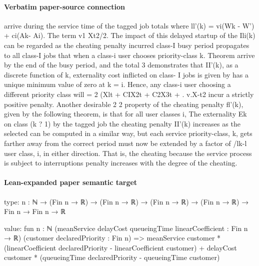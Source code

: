 \documentclass[10pt]{article}
\begin{document}
\paragraph{Verbatim paper-source connection}
\begin{ReviewVerbatim}
arrive during the service time of the tagged job totals                 where ll'(k) = vi(Wk - W') + ci(Ak- Ai). The term
v1 Xt2/2. The impact of this delayed startup of the                     Ili(k) can be regarded as the cheating penalty incurred
class-I busy period propagates to all class-I jobs that                 when a class-i user chooses priority-class k. Theorem
arrive by the end of the busy period, and the total                     3 demonstrates that II'(k), as a discrete function of k,
externality cost inflicted on class- I jobs is given by                 has a unique minimum value of zero at k = i. Hence,
                                                                        any class-i user choosing a different priority class will
    = 2 (Xlt + CIX2t + C2X3t + . v.X-t2                                 incur a strictly positive penalty. Another desirable
              2         2                                               property of the cheating penalty fl'(k), given by the
                                                                        following theorem, is that for all user classes i,
The externality Ek on class (k ? 1) by the tagged job
                                                                        the cheating penalty II'(k) increases as the selected
can be computed in a similar way, but each service
                                                                        priority-class, k, gets farther away from the correct
period must now be extended by a factor of /lk-l
                                               user class, i, in either direction. That is, the cheating
because the service process is subject to interruptions
                                                                        penalty increases with the degree of the cheating.
\end{ReviewVerbatim}



\paragraph{Lean-expanded paper semantic target}
\begin{ReviewVerbatim}
type:
{n : ℕ} → (Fin n → ℝ) → (Fin n → ℝ) → (Fin n → ℝ) → (Fin n → ℝ) → Fin n → Fin n → ℝ

value:
fun {n : ℕ} (meanService delayCost queueingTime linearCoefficient : Fin n → ℝ) (customer declaredPriority : Fin n) =>
  meanService customer * (linearCoefficient declaredPriority - linearCoefficient customer) +
    delayCost customer * (queueingTime declaredPriority - queueingTime customer)
\end{ReviewVerbatim}
\end{document}

